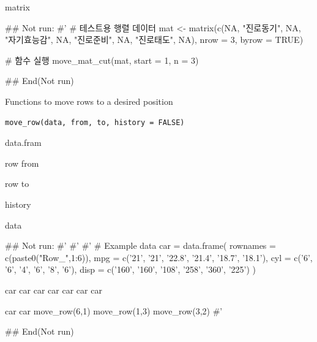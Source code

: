 \documentclass[a4paper]{book}
\begin{document}
%
\begin{Value}
matrix
\end{Value}
%
\begin{Examples}
\begin{ExampleCode}

## Not run: 
#'
# 테스트용 행렬 데이터
mat <- matrix(c(NA, "진로동기", NA, "자기효능감", NA,
    "진로준비", NA, "진로태도", NA), nrow = 3, byrow = TRUE)

# 함수 실행
move_mat_cut(mat, start = 1, n = 3)


## End(Not run)


\end{ExampleCode}
\end{Examples}
%
\begin{Description}
Functions to move rows to a desired position
\end{Description}
%
\begin{Usage}
\begin{verbatim}
move_row(data, from, to, history = FALSE)
\end{verbatim}
\end{Usage}
%
\begin{Arguments}
\begin{ldescription}
\item[\code{data}] data.fram

\item[\code{from}] row from

\item[\code{to}] row to

\item[\code{history}] history
\end{ldescription}
\end{Arguments}
%
\begin{Value}
data
\end{Value}
%
\begin{Examples}
\begin{ExampleCode}

## Not run: 
#' #'
#' # Example data
car = data.frame(
  rownames = c(paste0("Row_",1:6)),
  mpg = c('21', '21', '22.8', '21.4', '18.7', '18.1'),
  cyl = c('6', '6', '4', '6', '8', '6'),
  disp = c('160', '160', '108', '258', '360', '225')
)

car
car%
car%
car%
car%
car%
car%

car
car%
  move_row(6,1)%
  move_row(1,3)%
  move_row(3,2)
#'

## End(Not run)


\end{ExampleCode}
\end{Examples}
\end{document}
